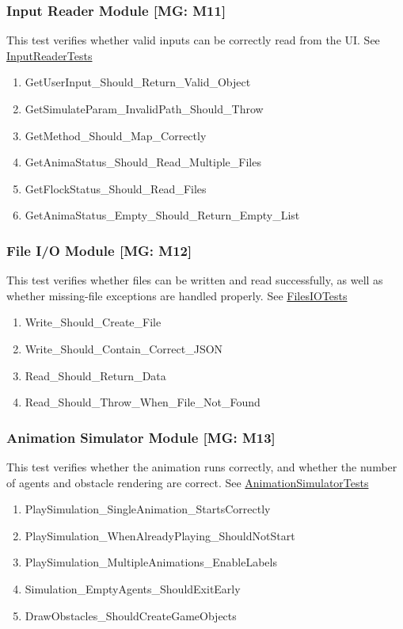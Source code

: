 \documentclass[12pt, titlepage]{article}
\begin{document}
\subsubsection{Input Reader Module [MG: M11]} \label{UTReader}

This test verifies whether valid inputs can be correctly read from the UI.
See \href{https://github.com/Mei0725/FlockingSimulator/blob/main/src/Assets/Tests/IO/InputReaderTests.cs}{InputReaderTests}
\begin{enumerate}
  \item GetUserInput\_Should\_Return\_Valid\_Object
  \item GetSimulateParam\_InvalidPath\_Should\_Throw
  \item GetMethod\_Should\_Map\_Correctly
  \item GetAnimaStatus\_Should\_Read\_Multiple\_Files
  \item GetFlockStatus\_Should\_Read\_Files
  \item GetAnimaStatus\_Empty\_Should\_Return\_Empty\_List
\end{enumerate}

\subsubsection{File I/O Module [MG: M12]} \label{UTIO}

This test verifies whether files can be written and read successfully, as well 
as whether missing-file exceptions are handled properly.
See \href{https://github.com/Mei0725/FlockingSimulator/blob/main/src/Assets/Tests/IO/FilesIOTests.cs}{FilesIOTests}
\begin{enumerate}
  \item Write\_Should\_Create\_File
  \item Write\_Should\_Contain\_Correct\_JSON
  \item Read\_Should\_Return\_Data
  \item Read\_Should\_Throw\_When\_File\_Not\_Found
\end{enumerate}

\subsubsection{Animation Simulator Module [MG: M13]} \label{UTAnime}

This test verifies whether the animation runs correctly, and whether the 
number of agents and obstacle rendering are correct.
See \href{https://github.com/Mei0725/FlockingSimulator/blob/main/src/Assets/Tests/Visualization/AnimationSimulatorTests.cs}{AnimationSimulatorTests}
\begin{enumerate}
  \item PlaySimulation\_SingleAnimation\_StartsCorrectly
  \item PlaySimulation\_WhenAlreadyPlaying\_ShouldNotStart
  \item PlaySimulation\_MultipleAnimations\_EnableLabels
  \item Simulation\_EmptyAgents\_ShouldExitEarly
  \item DrawObstacles\_ShouldCreateGameObjects
\end{enumerate}
\end{document}
